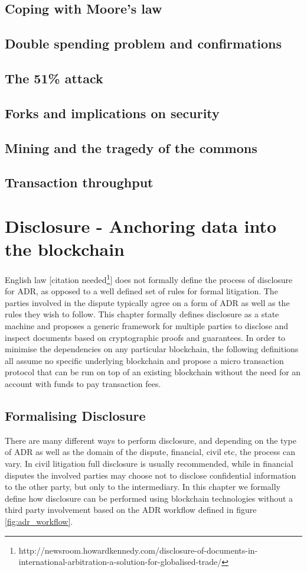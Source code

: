 \documentclass[12pt,msc,a4paper,oneside]{ucl_thesis}
\begin{document}
\section{Coping with Moore's law}
\section{Double spending problem and confirmations}
\section{The 51\% attack}
\section{Forks and implications on security}
\section{Mining and the tragedy of the commons}
\section{Transaction throughput}


\chapter{Disclosure - Anchoring data into the blockchain} \label{chapter:anchoring_data_into_the_blockchain}
English law [citation needed\footnote{http://newsroom.howardkennedy.com/disclosure-of-documents-in-international-arbitration-a-solution-for-globalised-trade/}] does not formally define the process of disclosure for ADR, as opposed to a well defined set of rules for formal litigation. The parties involved in the dispute typically agree on a form of ADR as well as the rules they wish to follow. This chapter formally defines disclosure as a state machine and proposes a generic framework for multiple parties to disclose and inspect documents based on cryptographic proofs and guarantees. In order to minimise the dependencies on any particular blockchain, the following definitions all assume no specific underlying blockchain and propose a micro transaction protocol that can be run on top of an existing blockchain without the need for an account with funds to pay transaction fees.


\section{Formalising Disclosure} \label{sec:formalising_disclosure}
There are many different ways to perform disclosure, and depending on the type of ADR as well as the domain of the dispute, financial, civil etc, the process can vary. In civil litigation full disclosure is usually recommended, while in financial disputes the involved parties may choose not to disclose confidential information to the other party, but only to the intermediary. In this chapter we formally define how disclosure can be performed using blockchain technologies without a third party involvement based on the ADR workflow defined in figure \ref{fig:adr_workflow}.
\end{document}

